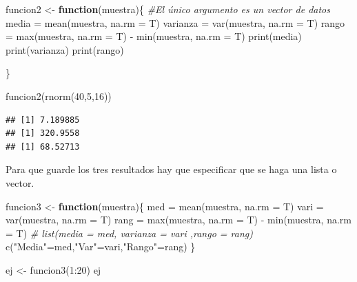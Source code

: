 \documentclass[
]{book}
\newenvironment{Shaded}{\begin{snugshade}}{\end{snugshade}}
\newcommand{\AttributeTok}[1]{\textcolor[rgb]{0.77,0.63,0.00}{#1}}
\newcommand{\CommentTok}[1]{\textcolor[rgb]{0.56,0.35,0.01}{\textit{#1}}}
\newcommand{\ControlFlowTok}[1]{\textcolor[rgb]{0.13,0.29,0.53}{\textbf{#1}}}
\newcommand{\DecValTok}[1]{\textcolor[rgb]{0.00,0.00,0.81}{#1}}
\newcommand{\FunctionTok}[1]{\textcolor[rgb]{0.00,0.00,0.00}{#1}}
\newcommand{\NormalTok}[1]{#1}
\newcommand{\OtherTok}[1]{\textcolor[rgb]{0.56,0.35,0.01}{#1}}
\newcommand{\SpecialCharTok}[1]{\textcolor[rgb]{0.00,0.00,0.00}{#1}}
\newcommand{\StringTok}[1]{\textcolor[rgb]{0.31,0.60,0.02}{#1}}
\begin{document}
\begin{Shaded}
\begin{Highlighting}[]
\NormalTok{funcion2 }\OtherTok{\textless{}{-}} \ControlFlowTok{function}\NormalTok{(muestra)\{     }\CommentTok{\#El único argumento es un vector de datos}
\NormalTok{  media }\OtherTok{=} \FunctionTok{mean}\NormalTok{(muestra, }\AttributeTok{na.rm =}\NormalTok{ T)}
\NormalTok{  varianza }\OtherTok{=} \FunctionTok{var}\NormalTok{(muestra, }\AttributeTok{na.rm =}\NormalTok{ T)}
\NormalTok{  rango }\OtherTok{=} \FunctionTok{max}\NormalTok{(muestra, }\AttributeTok{na.rm =}\NormalTok{ T) }\SpecialCharTok{{-}} \FunctionTok{min}\NormalTok{(muestra, }\AttributeTok{na.rm =}\NormalTok{ T)}
  \FunctionTok{print}\NormalTok{(media)}
  \FunctionTok{print}\NormalTok{(varianza)}
  \FunctionTok{print}\NormalTok{(rango)}

\NormalTok{\}}

\FunctionTok{funcion2}\NormalTok{(}\FunctionTok{rnorm}\NormalTok{(}\DecValTok{40}\NormalTok{,}\DecValTok{5}\NormalTok{,}\DecValTok{16}\NormalTok{))}
\end{Highlighting}
\end{Shaded}

\begin{verbatim}
## [1] 7.189885
## [1] 320.9558
## [1] 68.52713
\end{verbatim}

Para que guarde los tres resultados hay que especificar que se haga una lista o vector.

\begin{Shaded}
\begin{Highlighting}[]
\NormalTok{funcion3 }\OtherTok{\textless{}{-}} \ControlFlowTok{function}\NormalTok{(muestra)\{     }
\NormalTok{  med }\OtherTok{=} \FunctionTok{mean}\NormalTok{(muestra, }\AttributeTok{na.rm =}\NormalTok{ T)}
\NormalTok{  vari }\OtherTok{=} \FunctionTok{var}\NormalTok{(muestra, }\AttributeTok{na.rm =}\NormalTok{ T)}
\NormalTok{  rang }\OtherTok{=} \FunctionTok{max}\NormalTok{(muestra, }\AttributeTok{na.rm =}\NormalTok{ T) }\SpecialCharTok{{-}} \FunctionTok{min}\NormalTok{(muestra, }\AttributeTok{na.rm =}\NormalTok{ T)}
  \CommentTok{\# list(media = med, varianza = vari ,rango = rang)}
  \FunctionTok{c}\NormalTok{(}\StringTok{"Media"}\OtherTok{=}\NormalTok{med,}\StringTok{"Var"}\OtherTok{=}\NormalTok{vari,}\StringTok{"Rango"}\OtherTok{=}\NormalTok{rang)}
\NormalTok{\}}

\NormalTok{ej }\OtherTok{\textless{}{-}} \FunctionTok{funcion3}\NormalTok{(}\DecValTok{1}\SpecialCharTok{:}\DecValTok{20}\NormalTok{)}
\NormalTok{ej}
\end{Highlighting}
\end{Shaded}
\end{document}
